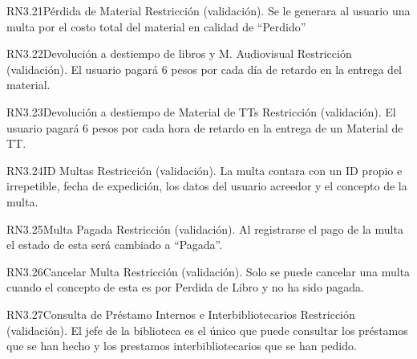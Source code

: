 \begin{BussinesRule}{RN3.21}{Pérdida de Material} 
	\BRitem[Tipo:] Restricción (validación).
	\BRitem[Descripción:]Se le generara al usuario una multa por el costo total del material en calidad de “Perdido”
\end{BussinesRule}

\begin{BussinesRule}{RN3.22}{Devolución a destiempo de libros y M. Audiovisual} 
	\BRitem[Tipo:] Restricción (validación).
	\BRitem[Descripción:]El usuario pagará 6 pesos por cada día de retardo en la entrega del material.
\end{BussinesRule}

\begin{BussinesRule}{RN3.23}{Devolución a destiempo de Material de TTs} 
	\BRitem[Tipo:] Restricción (validación).
	\BRitem[Descripción:]El usuario pagará 6 pesos por cada hora de retardo en la entrega de un Material de TT. 
\end{BussinesRule}

\begin{BussinesRule}{RN3.24}{ID Multas} 
	\BRitem[Tipo:] Restricción (validación).
	\BRitem[Descripción:]La multa contara con un ID propio e irrepetible, fecha de expedición, los datos del usuario acreedor y el concepto de la multa.


\end{BussinesRule}

\begin{BussinesRule}{RN3.25}{Multa Pagada} 
	\BRitem[Tipo:] Restricción (validación).
	\BRitem[Descripción:]Al registrarse el pago de la multa el estado de esta será cambiado a “Pagada”.
\end{BussinesRule}

\begin{BussinesRule}{RN3.26}{Cancelar Multa} 
	\BRitem[Tipo:] Restricción (validación).
	\BRitem[Descripción:]Solo se puede cancelar una multa cuando el concepto de esta es por Perdida de Libro y no ha sido pagada.
\end{BussinesRule}

\begin{BussinesRule}{RN3.27}{Consulta de Préstamo Internos e Interbibliotecarios} 
	\BRitem[Tipo:] Restricción (validación).
	\BRitem[Descripción:]El jefe de la biblioteca es el único que puede consultar los préstamos que se han hecho y los prestamos interbibliotecarios que se han pedido.
\end{BussinesRule}

